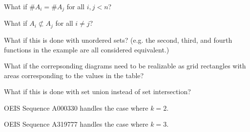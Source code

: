 \documentclass{article}
\begin{document}
\begin{related}
  \item What if $\#A_i = \#A_j$ for all $i,j < n$?
  \item What if $A_i \not\subset A_j$ for all $i \neq j$?
  \item What if this is done with unordered sets? (e.g. the second, third, and
  fourth functions in the example are all considered equivalent.)
  \item What if the correpsonding diagrams need to be realizable as grid
  rectangles with areas corresponding to the values in the table?
  \item What if this is done with set union instead of set intersection?
\end{related}

\begin{references}
  \item OEIS Sequence A000330 handles the case where $k = 2$.
  \item OEIS Sequence A319777 handles the case where $k = 3$.
\end{references}
\end{document}
